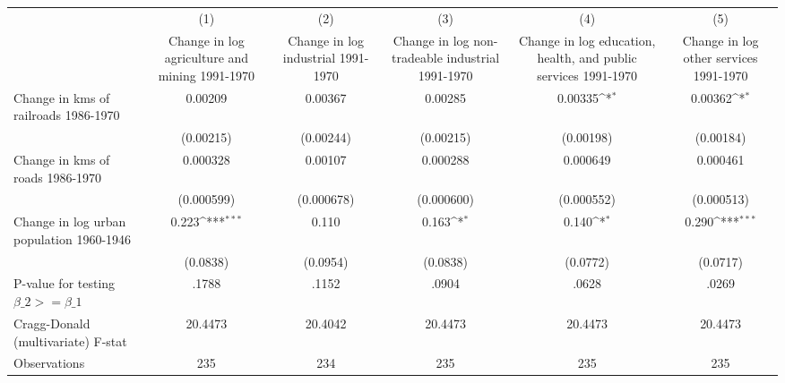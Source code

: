 {
\def\sym#1{\ifmmode^{#1}\else\(^{#1}\)\fi}
\begin{tabular}{l*{5}{c}}
\hline\hline
                &\multicolumn{1}{c}{(1)}&\multicolumn{1}{c}{(2)}&\multicolumn{1}{c}{(3)}&\multicolumn{1}{c}{(4)}&\multicolumn{1}{c}{(5)}\\
                &\multicolumn{1}{c}{Change in log agriculture and mining 1991-1970}&\multicolumn{1}{c}{Change in log industrial 1991-1970}&\multicolumn{1}{c}{Change in log non-tradeable industrial 1991-1970}&\multicolumn{1}{c}{Change in log education, health, and public services 1991-1970}&\multicolumn{1}{c}{Change in log other services 1991-1970}\\
\hline
Change in kms of railroads 1986-1970&  0.00209         &  0.00367         &  0.00285         &  0.00335\sym{*}  &  0.00362\sym{*}  \\
                &(0.00215)         &(0.00244)         &(0.00215)         &(0.00198)         &(0.00184)         \\
[1em]
Change in kms of roads 1986-1970& 0.000328         &  0.00107         & 0.000288         & 0.000649         & 0.000461         \\
                &(0.000599)         &(0.000678)         &(0.000600)         &(0.000552)         &(0.000513)         \\
[1em]
Change in log urban population 1960-1946&    0.223\sym{***}&    0.110         &    0.163\sym{*}  &    0.140\sym{*}  &    0.290\sym{***}\\
                & (0.0838)         & (0.0954)         & (0.0838)         & (0.0772)         & (0.0717)         \\
\hline
P-value for testing $\beta\_{2} >= \beta\_{1}$&    .1788         &    .1152         &    .0904         &    .0628         &    .0269         \\
Cragg-Donald (multivariate) F-stat&  20.4473         &  20.4042         &  20.4473         &  20.4473         &  20.4473         \\
Observations    &      235         &      234         &      235         &      235         &      235         \\
\hline\hline
\end{tabular}
}

